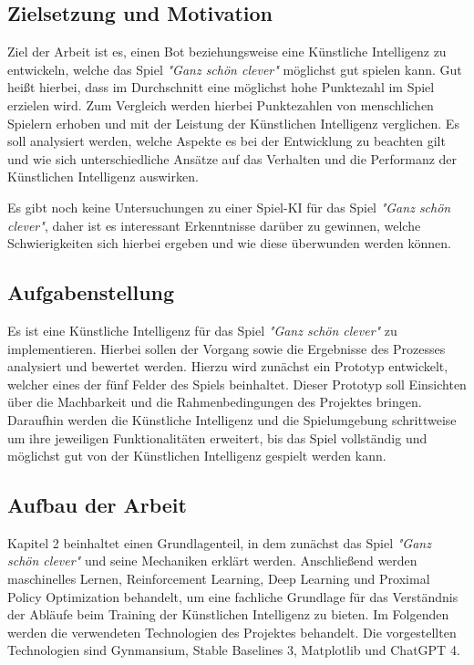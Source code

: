 \subsection{Zielsetzung und Motivation}
Ziel der Arbeit ist es, einen Bot beziehungsweise eine Künstliche Intelligenz zu entwickeln, welche das Spiel \textit{"Ganz schön clever"} möglichst gut spielen kann. Gut heißt hierbei, dass im Durchschnitt eine möglichst hohe Punktezahl im Spiel erzielen wird. Zum Vergleich werden hierbei Punktezahlen von menschlichen Spielern erhoben und mit der Leistung der Künstlichen Intelligenz verglichen. Es soll analysiert werden, welche Aspekte es bei der Entwicklung zu beachten gilt und wie sich unterschiedliche Ansätze auf das Verhalten und die Performanz der Künstlichen Intelligenz auswirken.

Es gibt noch keine Untersuchungen zu einer Spiel-KI für das Spiel \textit{"Ganz schön clever"}, daher ist es interessant Erkenntnisse darüber zu gewinnen, welche Schwierigkeiten sich hierbei ergeben und wie diese überwunden werden können.
\subsection{Aufgabenstellung}
Es ist eine Künstliche Intelligenz für das Spiel \textit{"Ganz schön clever"} zu implementieren. Hierbei sollen der Vorgang sowie die Ergebnisse des Prozesses analysiert und bewertet werden. Hierzu wird zunächst ein Prototyp entwickelt, welcher eines der fünf Felder des Spiels beinhaltet. Dieser Prototyp soll Einsichten über die Machbarkeit und die Rahmenbedingungen des Projektes bringen. Daraufhin werden die Künstliche Intelligenz und die Spielumgebung schrittweise um ihre jeweiligen Funktionalitäten erweitert, bis das Spiel vollständig und möglichst gut von der Künstlichen Intelligenz gespielt werden kann.
\subsection{Aufbau der Arbeit}
Kapitel 2 beinhaltet einen Grundlagenteil, in dem zunächst das Spiel \textit{"Ganz schön clever"} und seine Mechaniken erklärt werden. Anschließend werden maschinelles Lernen, Reinforcement Learning, Deep Learning und Proximal Policy Optimization behandelt, um eine fachliche Grundlage für das Verständnis der Abläufe beim Training der Künstlichen Intelligenz zu bieten. Im Folgenden werden die verwendeten Technologien des Projektes behandelt. Die vorgestellten Technologien sind Gynmansium, Stable Baselines 3, Matplotlib und ChatGPT 4.

